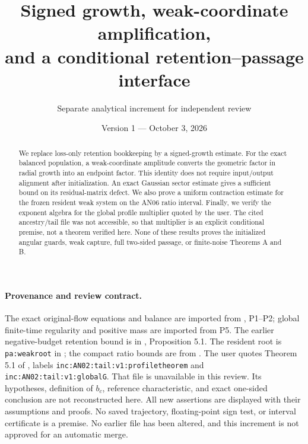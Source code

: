 \documentclass[11pt]{article}
\title{Signed growth, weak-coordinate amplification,\\and a conditional retention--passage interface}
\author{Separate analytical increment for independent review}
\date{Version 1 --- October 3, 2026}
\numberwithin{equation}{section}
\theoremstyle{remark}\newtheorem{remark}[theorem]{Remark}
\newcommand{\1}{\mathbf1}
\begin{document}
\maketitle
\begin{abstract}
We replace loss-only retention bookkeeping by a signed-growth estimate.
For the exact balanced population, a weak-coordinate amplitude converts the
geometric factor in radial growth into an endpoint factor. This identity does
not require input/output alignment after initialization. An exact Gaussian
sector estimate gives a sufficient bound on its residual-matrix defect.
We also prove a uniform contraction estimate for the frozen resident weak
system on the AN06 ratio interval. Finally, we verify the exponent algebra
for the global profile multiplier quoted by the user. The cited ancestry/tail
file was not accessible, so that multiplier is an explicit conditional
premise, not a theorem verified here. None of these results proves the
initialized angular guards, weak capture, full two-sided passage, or
finite-noise Theorems A and B.
\end{abstract}

\paragraph{Provenance and review contract.}
The exact original-flow equations and balance are imported from
, P1--P2; global finite-time
regularity and positive mass are imported from P5. The earlier negative-budget
retention bound is in ,
Proposition 5.1. The resident root is \texttt{pa:weakroot} in
; the compact ratio bounds are from
.
The user quotes Theorem 5.1 of
, labels
\texttt{inc:AN02:tail:v1:profiletheorem} and
\texttt{inc:AN02:tail:v1:globalG}. That file is unavailable in this review.
Its hypotheses, definition of $b_c$, reference characteristic, and exact
one-sided conclusion are not reconstructed here.
All new assertions are displayed with their assumptions and proofs. No saved
trajectory, floating-point sign test, or interval certificate is a premise.
No earlier file has been altered, and this increment is not approved for an
automatic merge.
\end{document}
